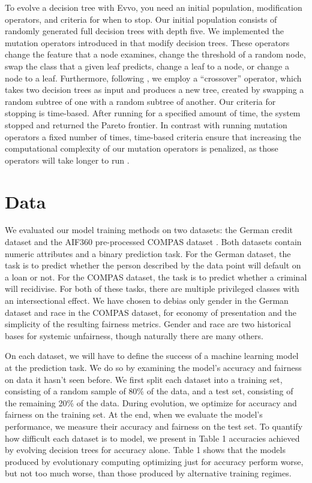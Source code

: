 \documentclass[twoside]{article}
\begin{document}
To evolve a decision tree with Evvo, you need an initial population, modification operators, and criteria for when to stop. Our initial population consists of randomly generated full decision trees with depth five. We implemented the mutation operators introduced in \citep{Kretowski:2005} that modify decision trees. These operators change the feature that a node examines, change the threshold of a random node, swap the class that a given leaf predicts, change a leaf to a node, or change a node to a leaf. Furthermore, following \citep{Papagelis:2000}, we employ a “crossover” operator, which takes two decision trees as input and produces a new tree, created by swapping a random subtree of one with a random subtree of another. Our criteria for stopping is time-based. After running for a specified amount of time, the system stopped and returned the Pareto frontier. In contrast with running mutation operators a fixed number of times, time-based criteria ensure that increasing the computational complexity of our mutation operators is penalized, as those operators will take longer to run \citep{Eiben:2015}.

\section{Data}
We evaluated our model training methods on two datasets: the German credit dataset \cite{Dua:2019} and the AIF360 pre-processed COMPAS dataset \citep{Larson:2016}. Both datasets contain numeric attributes and a binary prediction task. For the German dataset, the task is to predict whether the person described by the data point will default on a loan or not. For the COMPAS dataset, the task is to predict whether a criminal will recidivise. For both of these tasks, there are multiple privileged classes with an intersectional effect. We have chosen to debias only gender in the German dataset and race in the COMPAS dataset, for economy of presentation and the simplicity of the resulting fairness metrics. Gender and race are two historical bases for systemic unfairness, though naturally there are many others.

On each dataset, we will have to define the success of a machine learning model at the prediction task. We do so by examining the model’s accuracy and fairness on data it hasn’t seen before. We first split each dataset into a training set, consisting of a random sample of 80\% of the data, and a test set, consisting of the remaining 20\% of the data. During evolution, we optimize for accuracy and fairness on the training set. At the end, when we evaluate the model’s performance, we measure their accuracy and fairness on the test set. To quantify how difficult each dataset is to model, we present in Table 1 accuracies achieved by evolving decision trees for accuracy alone. Table 1 shows that the models produced by evolutionary computing optimizing just for accuracy perform worse, but not too much worse, than those produced by alternative training regimes. 
\end{document}
